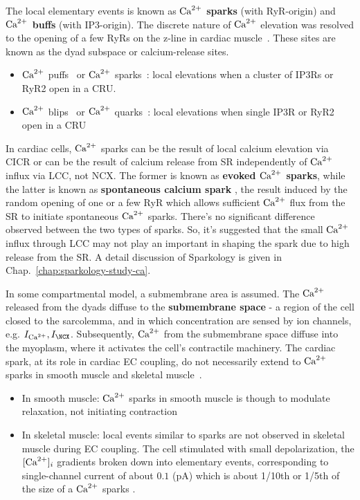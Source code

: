 \begin{framed}
  The local elementary events is known as {\bf ${\text{Ca}^{2+}}$ sparks} (with
  RyR-origin) and {\bf ${\text{Ca}^{2+}}$ buffs} (with IP3-origin).  The discrete nature
  of ${\text{Ca}^{2+}}$ elevation was resolved to the opening of a few RyRs on the
  z-line in cardiac muscle~\citep{shacklock1995}. These sites are
  known as the dyad subspace or calcium-release sites. 
  
  \begin{itemize}
  \item ${\text{Ca}^{2+}}$ puffs~\citep{parker1991rr} or ${\text{Ca}^{2+}}$
    sparks~\citep{cheng1993cse}: local elevations when a cluster of
    IP3Rs or RyR2 open in a CRU.
    
  \item ${\text{Ca}^{2+}}$ blips~\citep{parker1996cta} or ${\text{Ca}^{2+}}$
    quarks~\citep{lipp1996}: local elevations when single IP3R or
    RyR2 open in a CRU
  \end{itemize}
\end{framed}

In cardiac cells, ${\text{Ca}^{2+}}$ sparks can be the result of local calcium elevation via
CICR or can be the result of calcium release from SR independently of ${\text{Ca}^{2+}}$
influx via LCC, not NCX. The former is known as {\bf evoked ${\text{Ca}^{2+}}$ sparks}, while
the latter is known as {\bf spontaneous calcium spark} \citep{cannell1995b}, the
result induced by the random opening of one or a few RyR which allows sufficient
${\text{Ca}^{2+}}$ flux from the SR to initiate spontaneous ${\text{Ca}^{2+}}$ sparks.
There's no significant  difference observed between the two types of sparks.
So, it's suggested that the small ${\text{Ca}^{2+}}$ influx through LCC may not play an
important in shaping the spark due to high release from the SR. A detail
discussion of Sparkology is given in Chap.~\ref{chap:sparkology-study-ca}.

In some compartmental model, a submembrane area is assumed. The ${\text{Ca}^{2+}}$ released
from the dyads diffuse to the {\bf submembrane space} - a region of the cell
closed to the sarcolemma, and in which concentration are sensed by ion channels,
e.g. $I_\Ca, I_\NCX$. Subsequently, ${\text{Ca}^{2+}}$ from the submembrane space diffuse
into the myoplasm, where it activates the cell's contractile machinery.
The cardiac spark, at its role in cardiac EC coupling, do not necessarily extend
to ${\text{Ca}^{2+}}$ sparks in smooth muscle and skeletal muscle~\citep{wier1999}.
\begin{itemize}
\item In smooth muscle: ${\text{Ca}^{2+}}$ sparks in smooth muscle is though to modulate
relaxation, not initiating contraction
\item In skeletal muscle: local events similar to sparks are not observed in
skeletal muscle during EC coupling. The cell stimulated with small depolarization, the
$[{\text{Ca}^{2+}}]_i$ gradients broken down into elementary events, corresponding to
single-channel current of about $0.1$ (pA)  which is about 1/10th or 1/5th of
the size of a ${\text{Ca}^{2+}}$ sparks \citep{tsugorka1995}.
\end{itemize}

